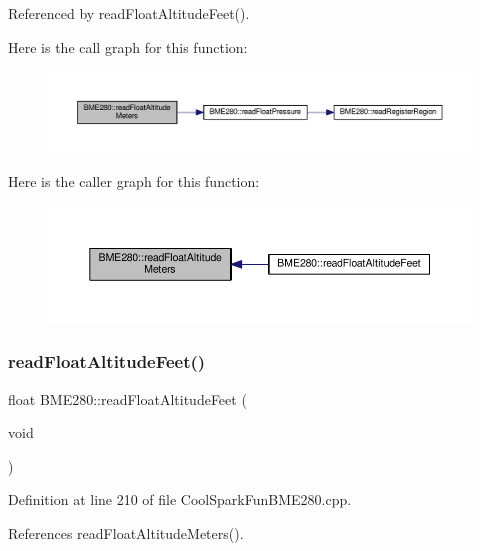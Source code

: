 Referenced by read\+Float\+Altitude\+Feet().

Here is the call graph for this function\+:
\nopagebreak
\begin{figure}[H]
\begin{center}
\leavevmode
\includegraphics[width=350pt]{df/dcf/class_b_m_e280_af67b56ba50760ee1d116acc6c5010221_cgraph}
\end{center}
\end{figure}
Here is the caller graph for this function\+:\nopagebreak
\begin{figure}[H]
\begin{center}
\leavevmode
\includegraphics[width=350pt]{df/dcf/class_b_m_e280_af67b56ba50760ee1d116acc6c5010221_icgraph}
\end{center}
\end{figure}
\mbox{\label{class_b_m_e280_a6525c8a26f887b52596c86bed99343cb}} 
\subsubsection{\texorpdfstring{read\+Float\+Altitude\+Feet()}{readFloatAltitudeFeet()}}
{\footnotesize\ttfamily float B\+M\+E280\+::read\+Float\+Altitude\+Feet (\begin{DoxyParamCaption}\item[{void}]{ }\end{DoxyParamCaption})}



Definition at line 210 of file Cool\+Spark\+Fun\+B\+M\+E280.\+cpp.



References read\+Float\+Altitude\+Meters().

